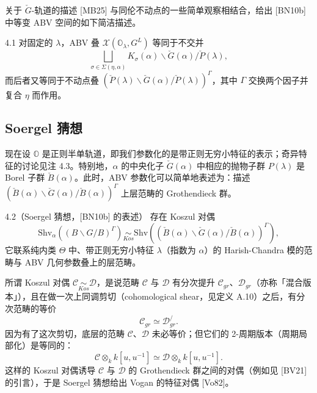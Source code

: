 
关于 $\check G$-轨道的描述 [MB25] 与同伦不动点的一些简单观察相结合，给出 [BN10b] 中等变 ABV 空间的如下简洁描述。

\begin{prop}{4.1}\label{prop:a5-03-4-1}
对固定的 $\lambda$，ABV 叠 $\mathcal X(\mathbb O_\lambda,G^L)$ 等同于不交并
\[
\bigsqcup_{\sigma\in\Sigma(\eta,\alpha)}K_\sigma(\alpha)\backslash\check G(\alpha)/\check P(\lambda),
\]
而后者又等同于不动点叠 $(\check P(\lambda)\backslash\check G(\alpha)/\check P(\lambda))^\Gamma$，其中 $\Gamma$ 交换两个因子并复合 $\eta$ 而作用。
\end{prop}

\subsection{Soergel 猜想}

现在设 $\mathbb O$ 是正则半单轨道，即我们参数化的是带正则无穷小特征的表示；奇异特征的讨论见注 4.3。特别地，$\alpha$ 的中央化子 $\check G(\alpha)$ 中相应的抛物子群 $P(\lambda)$ 是 Borel 子群 $\check B(\alpha)$。此时，ABV 参数化可以简单地表述为：描述 $(\check B(\alpha)\backslash\check G(\alpha)/\check B(\alpha))^\Gamma$ 上层范畴的 Grothendieck 群。

\begin{conj}{4.2}（Soergel 猜想，[BN10b] 的表述）\label{conj:a5-03-4-2}
存在 Koszul 对偶
\[
\mathrm{Shv}_\alpha((B\backslash G/B)^\Gamma)\underset{Kos}{\sim}\mathrm{Shv}((\check B(\alpha)\backslash\check G(\alpha)/\check B(\alpha))^\Gamma),
\]
它联系纯内类 $\Theta$ 中、带正则无穷小特征 $\lambda$（指数为 $\alpha$）的 Harish-Chandra 模的范畴与 ABV 几何参数叠上的层范畴。
\end{conj}

所谓 Koszul 对偶 $\mathcal C\underset{Kos}{\sim}\mathcal D$，是说范畴 $\mathcal C$ 与 $\mathcal D$ 有分次提升 $\mathcal C_{gr}$、$\mathcal D_{gr}$（亦称「混合版本」），且在做一次上同调剪切（cohomological shear，见定义 A.10）之后，有分次范畴的等价
\[
\mathcal C_{gr}\simeq\mathcal D^{/}_{gr}.
\]
因为有了这次剪切，底层的范畴 $\mathcal C$、$\mathcal D$ 未必等价；但它们的 2-周期版本（周期局部化）是等同的：
\[
\mathcal C\otimes_k k[u,u^{-1}]\simeq\mathcal D\otimes_k k[u,u^{-1}].
\]
这样的 Koszul 对偶诱导 $\mathcal C$ 与 $\mathcal D$ 的 Grothendieck 群之间的对偶（例如见 [BV21] 的引言），于是 Soergel 猜想给出 Vogan 的特征对偶 [Vo82]。

